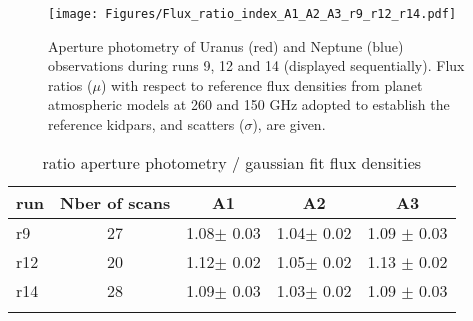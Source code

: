 \begin{figure}[ht!]
  \begin{center}
    \texttt{[image: Figures/Flux\_ratio\_index\_A1\_A2\_A3\_r9\_r12\_r14.pdf]}
    \caption{Aperture photometry of Uranus (red) and Neptune (blue) observations during runs 9, 12 and 14 (displayed sequentially). Flux ratios ($\mu$) with respect to
reference flux densities from planet atmospheric models at 260 and 150 GHz adopted to establish the  reference kidpars,  and scatters ($\sigma$), are given.}
    \label{fig:Uranus_s308}
  \end{center}
\end{figure}



\begin{table*}[!h]
\caption{ratio aperture photometry / gaussian fit flux densities   }
\label{tab:ratio}
\centering
\begin{tabular}{l| c | c c c }
\hline\hline
\noalign{\smallskip}
run     & Nber of scans  &  A1    &    A2   &  A3    \\
\hline
r9    & 27  &  1.08$\pm$ 0.03    &  1.04$\pm$ 0.02 & 1.09 $\pm$ 0.03     \\
r12   & 20  &  1.12$\pm$ 0.02    &  1.05$\pm$ 0.02 & 1.13 $\pm$ 0.02     \\
r14   & 28  &  1.09$\pm$ 0.03    &  1.03$\pm$ 0.02 & 1.09 $\pm$ 0.03     \\
\noalign{\smallskip}
\hline
\end{tabular}
\end{table*}
